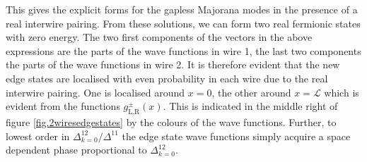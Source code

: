 This gives the explicit forms for the gapless Majorana modes in the presence of a real interwire pairing. From these solutions, we can form two real fermionic states with zero energy. The two first components of the vectors in the above expressions are the parts of the wave functions in wire 1, the last two components the parts of the wave functions in wire 2. It is therefore evident that the new edge states are localised with even probability in each wire due to the real interwire pairing. One is localised around $x = 0$, the other around $x = \mathcal{L}$ which is evident from the functions $g_{\text{L,R}}^{\pm}(x)$. This is indicated in the middle right of figure \ref{fig.2wiresedgestates} by the colours of the wave functions. Further, to lowest order in $\Delta^{12}_{k = 0}/\Delta^{11}$ the edge state wave functions simply acquire a space dependent phase proportional to $\Delta^{12}_{k=0}$.  

